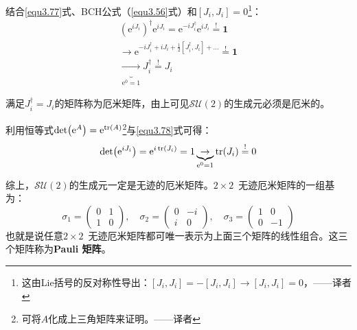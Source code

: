 结合\eqref{equ3.77}式、BCH公式（\eqref{equ3.56}式）和$[J_i, J_i] = 0$\footnote{这由Lie括号的反对称性导出：$[J_i, J_i] = -[J_i, J_i] \rightarrow [J_i, J_i] = 0$，——译者}：
\begin{align}
(\mathrm{e}^{i J_i})^\dag \mathrm{e}^{i J_i} = \mathrm{e}^{-i J_i^\dag} \mathrm{e}^{i J_i} \stackrel{!}{=} \mathbf{1} \nonumber \\
\rightarrow \mathrm{e}^{-i J_i^\dag + i J_i + \frac{1}{2}[J_i^\dag, J_i] + \dots } \stackrel{!}{=} \mathbf{1} \nonumber \\
\label{equ3.79}
\underbrace{\rightarrow}_{\mathrm{e}^0 = 1} J_i^\dag \stackrel{!}{=} J_i
\end{align}

满足$J_i^\dag = J_i$的矩阵称为厄米矩阵，由上可见$\mathcal{SU}(2)$的生成元必须是厄米的。

利用恒等式$\det (\mathrm{e}^A) = \mathrm{e}^{\tr (A)}$\footnote{可将$A$化成上三角矩阵来证明。——译者}与\eqref{equ3.78}式可得：
\begin{equation}
\label{equ3.80}
\det (\mathrm{e}^{i J_i}) = \mathrm{e}^{i \tr(J_i)} = 1 \underbrace{\rightarrow}_{\mathrm{e}^0 = 1} \tr (J_i) \stackrel{!}{=} 0
\end{equation}

综上，$\mathcal{SU}(2)$的生成元一定是无迹的厄米矩阵。$2 \times 2$\ 无迹厄米矩阵的一组基为：
\begin{equation}
\label{equ3.81}
\sigma_1 =	\begin{pmatrix}
				0 & 1 \\ 1 & 0
			\end{pmatrix}
, \quad
\sigma_2 = 	\begin{pmatrix}
				0 & -i \\ i & 0
			\end{pmatrix}
, \quad
\sigma_3 =	\begin{pmatrix}
				1 & 0 \\ 0 & -1
			\end{pmatrix}
\end{equation}
也就是说任意$2 \times 2$\ 无迹厄米矩阵都可唯一表示为上面三个矩阵的线性组合。这三个矩阵称为{\bfseries Pauli 矩阵}。

